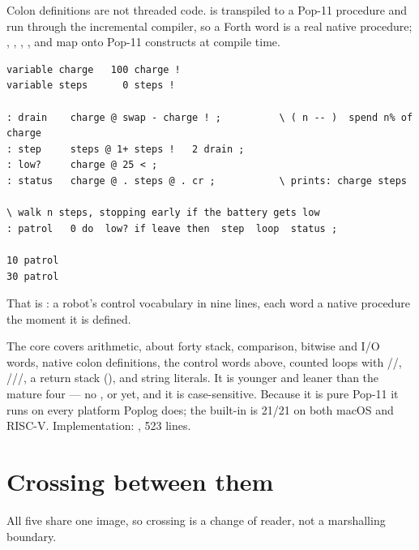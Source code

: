 Colon definitions are not threaded code.  is
transpiled to a Pop-11 procedure and run through the incremental compiler, so
a Forth word is a real native procedure; ,
, , ,
 and  map onto Pop-11 constructs at compile time.

\begin{lstlisting}[language=Forth]
variable charge   100 charge !
variable steps      0 steps !

: drain    charge @ swap - charge ! ;          \ ( n -- )  spend n% of charge
: step     steps @ 1+ steps !   2 drain ;
: low?     charge @ 25 < ;
: status   charge @ . steps @ . cr ;           \ prints: charge steps

\ walk n steps, stopping early if the battery gets low
: patrol   0 do  low? if leave then  step  loop  status ;

10 patrol
30 patrol
\end{lstlisting}

That is : a robot's control vocabulary in nine lines,
each word a native procedure the moment it is defined.

The core covers arithmetic, about forty stack, comparison, bitwise and I/O
words, native colon definitions, the control words above, counted loops with
//, ///\code{!},
a return stack (), and string literals. It is younger and
leaner than the mature four --- no ,  or
 yet, and it is case-sensitive. Because it is pure Pop-11 it runs
on every platform Poplog does; the built-in  is 21/21 on both
macOS  and RISC-V. Implementation:
, 523 lines.

\section{Crossing between them}

All five share one image, so crossing is a change of reader, not a marshalling
boundary.

